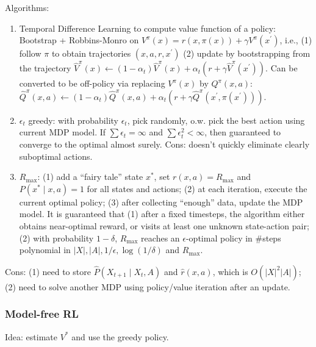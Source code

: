 Algorithms:
\begin{enumerate}
    \item Temporal Difference Learning to compute value function of a policy: Bootstrap + Robbins-Monro on $V^\pi (x) = r(x,\pi(x)) + \gamma V^\pi (x^\prime)$, i.e., (1) follow $\pi$ to obtain trajectories $(x,a,r,x^\prime)$ (2) update by bootstrapping from the trajectory $\hat{V}^{\pi}(x) \leftarrow\left(1-\alpha_{t}\right) \hat{V}^{\pi}(x)+\alpha_{t}\left(r+\gamma \hat{V}^{\pi}\left(x^{\prime}\right)\right)$. Can be converted to be off-policy via replacing $V^\pi(x)$ by $Q^\pi(x,a)$: $\hat{Q}^{\pi}(x, a) \leftarrow\left(1-\alpha_{t}\right) \hat{Q}^{\pi}(x, a)+\alpha_{t}\left(r+\gamma \hat{Q}^{\pi}\left(x^{\prime}, \pi\left(x^{\prime}\right)\right)\right)$.
    \item $\epsilon_t$ greedy: with probability $\epsilon_t$, pick randomly, o.w. pick the best action using current MDP model. If $\sum \epsilon_t=\infty$ and $\sum \epsilon_t^2<\infty$, then guaranteed to converge to the optimal almost surely. Cons: doesn't quickly eliminate clearly suboptimal actions.
    \item $R_{\max}$: (1) add a ``fairy tale'' state $x^*$, set $r(x,a)=R_{\max}$ and $P(x^*\mid x,a)=1$ for all states and actions; (2) at each iteration, execute the current optimal policy; (3) after collecting ``enough'' data, update the MDP model. It is guaranteed that (1) after a fixed timesteps, the algorithm either obtains near-optimal reward, or visits at least one unknown state-action pair; (2) with probability $1-\delta$, $R_{\max}$ reaches an $\epsilon$-optimal policy in \#steps polynomial in $|X|,|A|,1/\epsilon, \log(1/\delta)$ and $R_{\max}$.
\end{enumerate}

Cons: (1) need to store $\hat{P}(X_{t+1}\mid X_t, A)$ and $\hat{r}(x,a)$, which is $O(|X|^2 |A|)$; (2) need to solve another MDP using policy/value iteration after an update. 

\subsubsection*{Model-free RL}

Idea: estimate $V^*$ and use the greedy policy.

